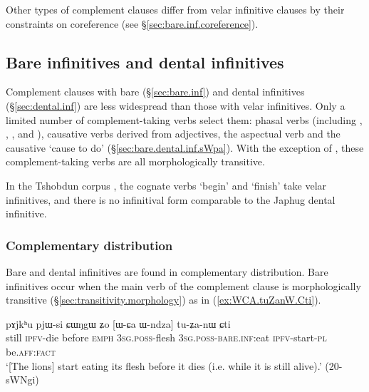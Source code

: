 Other types of complement clauses differ from velar infinitive clauses by their constraints on coreference (see §\ref{sec:bare.inf.coreference}).

 \subsection{Bare infinitives and dental infinitives} \label{sec:bare.dental.inf}
  
   
Complement clauses with bare (§\ref{sec:bare.inf}) and dental infinitives (§\ref{sec:dental.inf}) are less widespread than those with velar infinitives. Only a limited number of com\-ple\-ment-taking verbs select them: phasal verbs (including , , , and ), causative verbs derived from adjectives, the aspectual verb  and the causative  `cause to do' (§\ref{sec:bare.dental.inf.sWpa}). With the exception of , these com\-ple\-ment-taking verbs are all morphologically transitive.

In the Tshobdun corpus \citet{jackson19tshobdun}, the cognate verbs  `begin'  and  `finish' take velar infinitives, and there is no infinitival form comparable to the Japhug dental infinitive.

\subsubsection{Complementary distribution} \label{sec:bare.inf.dental.complementary}

Bare and dental infinitives are found in complementary distribution. Bare infinitives occur when the main verb of the complement clause is morphologically transitive (§\ref{sec:transitivity.morphology}) as in (\ref{ex:WCA.tuZanW.Cti}).

\begin{exe} 
\ex \label{ex:WCA.tuZanW.Cti}
\gll pɤjkʰu pjɯ-si ɕɯŋgɯ ʑo [ɯ-ɕa ɯ-ndza] tu-ʑa-nɯ ɕti \\
still \textsc{ipfv}-die before \textsc{emph} \textsc{3sg}.\textsc{poss}-flesh \textsc{3sg}.\textsc{poss}-\textsc{bare}.\textsc{inf}:eat \textsc{ipfv}-start-\textsc{pl} be.\textsc{aff}:\textsc{fact} \\
\glt `[The lions] start eating its flesh before it dies (i.e. while it is still alive).' (20-sWNgi)
  \end{exe} 

